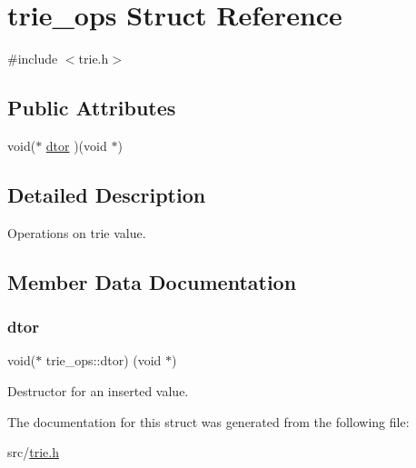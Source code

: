 \hypertarget{structtrie__ops}{}\section{trie\+\_\+ops Struct Reference}
\label{structtrie__ops}


{\ttfamily \#include $<$trie.\+h$>$}

\subsection*{Public Attributes}
\begin{DoxyCompactItemize}
\item 
void($\ast$ \mbox{\hyperlink{structtrie__ops_aff5ce0c5a4080e51095537fa7736a703}{dtor}} )(void $\ast$)
\end{DoxyCompactItemize}


\subsection{Detailed Description}
Operations on trie value. 

\subsection{Member Data Documentation}
\mbox{\label{structtrie__ops_aff5ce0c5a4080e51095537fa7736a703}} 
\subsubsection{\texorpdfstring{dtor}{dtor}}
{\footnotesize\ttfamily void($\ast$ trie\+\_\+ops\+::dtor) (void $\ast$)}

Destructor for an inserted value. 

The documentation for this struct was generated from the following file\+:\begin{DoxyCompactItemize}
\item 
src/\mbox{\hyperlink{trie_8h}{trie.\+h}}\end{DoxyCompactItemize}
